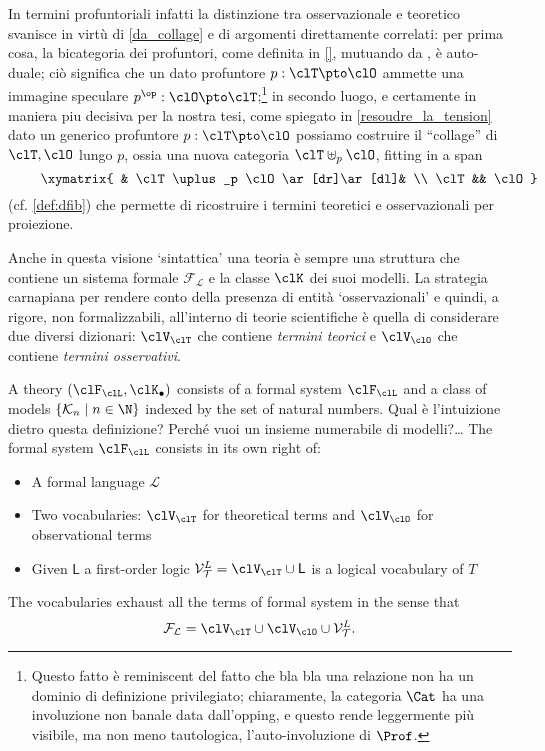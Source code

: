 In termini profuntoriali infatti la distinzione tra osservazionale e teoretico svanisce in virtù di \autoref{da_collage} e di argomenti direttamente correlati: per prima cosa, la bicategoria dei profuntori, come definita in \autoref{}, mutuando da \cite{benabou2000distributors}, è auto-duale; ciò significa che un dato profuntore $p : \clT \pto \clO$ ammette una immagine speculare $p^\op : \clO \pto \clT$;\footnote{Questo fatto è reminiscent del fatto che bla bla una relazione non ha un dominio di definizione privilegiato; chiaramente, la categoria $\Cat$ ha una involuzione non banale data dall'opping, e questo rende leggermente più visibile, ma non meno tautologica, l'auto-involuzione di $\Prof$.} in secondo luogo, e certamente in maniera piu decisiva per la nostra tesi, come spiegato in \autoref{resoudre_la_tension} dato un generico profuntore $p : \clT \pto\clO$ possiamo costruire il ``collage'' di $\clT,\clO$ lungo $p$, ossia una nuova categoria $\clT\uplus_p\clO$, fitting in a span 
\[ \vcenter{\xymatrix{
	& \clT\uplus_p \clO \ar[dr]\ar[dl]& \\ 
	\clT  && \clO 
}} \] (cf. \autoref{def:dfib})
che permette di ricostruire i termini teoretici e osservazionali per proiezione.
\begin{remark}\label{hint_at_collage}
	Anche in questa visione `sintattica' \cite{giunti2016} una teoria è sempre una struttura che contiene un sistema formale $\mathcal{F_L}$ e la classe $\clK$ dei suoi modelli. La strategia carnapiana per rendere conto della presenza di entità `osservazionali' e quindi, a rigore, non formalizzabili, all'interno di teorie scientifiche è quella di considerare due diversi dizionari: $\clV_\clT$ che contiene \emph{termini teorici} e $\clV_\clO$ che contiene \emph{termini osservativi}. 
\end{remark}


\begin{definition}
	A theory $(\clF_\clL, \clK_\bullet)$ consists of a formal system $\clF_\clL$ and a class of models $\{\mathcal{K}_n \mid n \in \N \}$ indexed by the set of natural numbers. 
	{\color{red} Qual è l'intuizione dietro questa definizione? Perché vuoi un insieme numerabile di modelli?\dots}
	The formal system $\clF_\clL$ consists in its own right of:
	\begin{itemize}
		\item A formal language $\mathcal{L}$ 
		\item Two vocabularies: $\clV_\clT$ for theoretical terms and $\clV_\clO$ for observational terms 
		\item Given $\mathsf{L}$ a first-order logic $\mathcal{V}_{\mathcal{T}}^L = \clV_\clT \cup \mathsf{L}$ is a logical vocabulary of $T$
	\end{itemize}    
\end{definition}
The vocabularies exhaust all the terms of formal system in the sense that 
\[\mathcal{F_L} = \clV_\clT \cup \clV_\clO \cup \mathcal{V}_{\mathcal{T}}^L.\]

